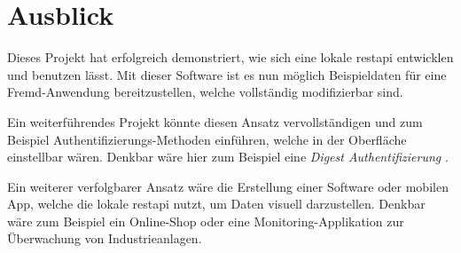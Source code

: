 \section{Ausblick} \label{sec:lookout}

Dieses Projekt hat erfolgreich demonstriert, wie sich eine lokale \gls{restapi} entwicklen und benutzen lässt. Mit dieser Software ist es nun möglich Beispieldaten für eine Fremd-Anwendung bereitzustellen, welche vollständig modifizierbar sind.

Ein weiterführendes Projekt könnte diesen Ansatz vervollständigen und zum Beispiel Authentifizierungs-Methoden einführen, welche in der Oberfläche einstellbar wären. Denkbar wäre hier zum Beispiel eine \textit{Digest Authentifizierung} \cite{NetworkWorkingGroup.2005}.

Ein weiterer verfolgbarer Ansatz wäre die Erstellung einer Software oder mobilen App, welche die lokale \gls{restapi} nutzt, um Daten visuell darzustellen. Denkbar wäre zum Beispiel ein Online-Shop oder eine Monitoring-Applikation zur Überwachung von Industrieanlagen. 
